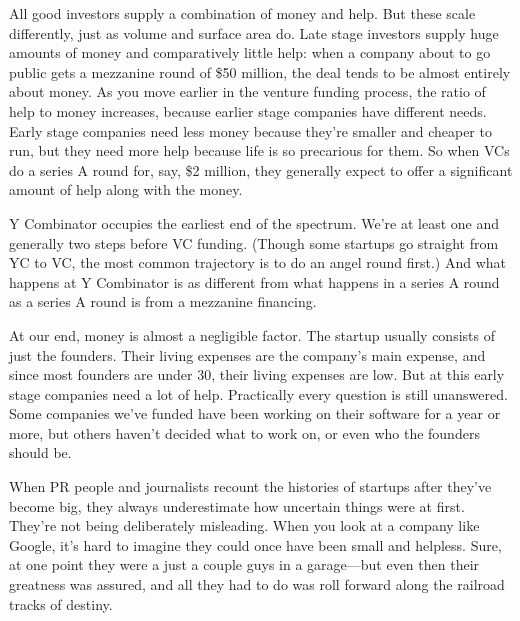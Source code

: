 All
                  good investors supply a combination of money and help. But
                  these scale differently, just as volume and surface area do.
                  Late stage investors supply huge amounts of money and
                  comparatively little help: when a company about to go public
                  gets a mezzanine round of \$50 million, the deal tends to be
                  almost entirely about money. As you move earlier in the
                  venture funding process, the ratio of help to money increases,
                  because earlier stage companies have different needs. Early
                  stage companies need less money because they're smaller and
                  cheaper to run, but they need more help because life is so
                  precarious for them. So when VCs do a series A round for, say,
                  \$2 million, they generally expect to offer a significant
                  amount of help along with the money.

Y Combinator
                  occupies the earliest end of the spectrum. We're at least one
                  and generally two steps before VC funding. (Though some
                  startups go straight from YC to VC, the most common trajectory
                  is to do an angel round first.) And what happens at Y
                  Combinator is as different from what happens in a series A
                  round as a series A round is from a mezzanine financing.

At
                  our end, money is almost a negligible factor. The startup
                  usually consists of just the founders. Their living expenses
                  are the company's main expense, and since most founders are
                  under 30, their living expenses are low. But at this early
                  stage companies need a lot of help. Practically every question
                  is still unanswered. Some companies we've funded have been
                  working on their software for a year or more, but others
                  haven't decided what to work on, or even who the founders
                  should be.

When PR people and journalists recount
                  the histories of startups after they've become big, they
                  always underestimate how uncertain things were at first.
                  They're not being deliberately misleading. When you look at a
                  company like Google, it's hard to imagine they could once have
                  been small and helpless. Sure, at one point they were a just a
                  couple guys in a garage---but even then their greatness
                  was assured, and all they had to do was roll forward along the
                  railroad tracks of destiny.

